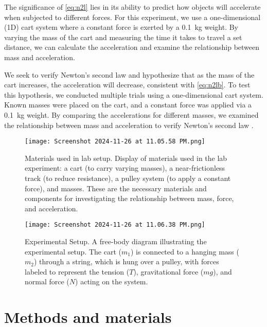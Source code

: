 ﻿\documentclass[reprint,amsmath,amssymb,aps]{revtex4-2}
\begin{document}
The significance of \cref{eq:n2l} lies in its ability to predict how objects will accelerate when subjected to different forces. For this experiment, we use a one-dimensional (1D) cart system where a constant force is exerted by a \qty{0.1}{\kilo\gram} weight. By varying the mass of the cart and measuring the time it takes to travel a set distance, we can calculate the acceleration and examine the relationship between mass and acceleration. 

We seek to verify Newton’s second law and hypothesize that as the mass of the cart increases, the acceleration will decrease, consistent with \cref{eq:n2lb}. To test this hypothesis, we conducted multiple trials using a one-dimensional cart system. Known masses were placed on the cart, and a constant force was applied via a \qty{0.1}{\kilo\gram} weight. By comparing the accelerations for different masses, we examined the relationship between mass and acceleration to verify Newton’s second law \cite{knight2017physics}.

\begin{figure}
\begin{center}
\texttt{[image: Screenshot 2024-11-26 at 11.05.58 PM.png]}
\end{center}
\caption{\label{fig:materials}Materials used in lab setup. Display of materials used in the lab experiment: a cart (to carry varying masses), a near-frictionless track (to reduce resistance), a pulley system (to apply a constant force), and masses. These are the necessary materials and components for investigating the relationship between mass, force, and acceleration.}
\end{figure}

\begin{figure}
\begin{center}
\texttt{[image: Screenshot 2024-11-26 at 11.06.38 PM.png]}
\end{center}
\caption{\label{fig:fbd}Experimental Setup. A free-body diagram illustrating the experimental setup. The cart ($m_1$) is connected to a hanging mass ($m_2$) through a string, which is hung over a pulley, with forces labeled to represent the tension ($T$), gravitational force ($mg$), and normal force ($N$) acting on the system.}
\end{figure}






\section{Methods and materials}
\end{document}
